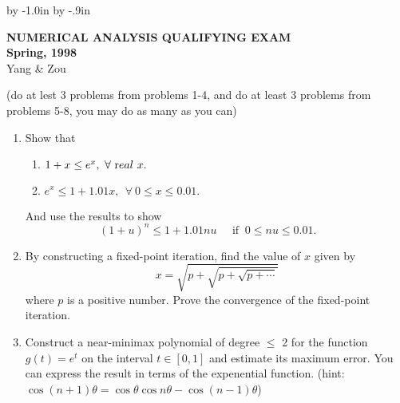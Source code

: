 

\def\hcorrection#1{\advance\hoffset by #1 }
\def\vcorrection#1{\advance\voffset by #1 }
 
 
\vcorrection{-1.0in}
\hcorrection{-.9in}
\textwidth 7.0in
\textheight 9.0in
 

 
\begin{large}
 
\begin{center}
    \begin{Large}
        {\bf NUMERICAL ANALYSIS QUALIFYING EXAM \\
            Spring, 1998}\\
            Yang \& Zou \\
    \end{Large}
\end{center}
 
\vspace{.1in}
 
 

(do at lest 3 problems from problems 1-4, and do at least
3 problems from problems 5-8, you may do as many as you can)  \\


 \begin{enumerate}

\item  
   Show that
\begin{enumerate}
     \item $1 + x \leq e^x, \ \forall \ {\mbox real } \  x .  $
     \item $ e^x \leq 1 + 1.01 x, \ \  \forall \  0 \leq x \leq 0.01. $
\end{enumerate}
   And use the results to show
\[ (1+u)^n \leq 1 + 1.01 nu     \;\;\;\;\; \mbox{if}\;\; 0 \leq nu \leq 0.01 .
\;\;\;\;\;\;      \]


 \item By constructing a fixed-point iteration,
find the value of  $x$ given by
\[   x = \sqrt{p+\sqrt{p+\sqrt{p + \cdots }}}   \]
where $p$ is a positive number. Prove the convergence of the
fixed-point iteration. 

  \item
 Construct a near-minimax polynomial of degree $\leq$ 2 for the
function $g(t) = e^t$ on the interval $t \in [0,1]$ and estimate its maximum
error. You can express the result in terms of the expenential function. 
(hint: $\cos (n+1)\theta = \cos \theta \cos n\theta  -\cos (n-1)\theta $)





\end{enumerate}
\end{large}
